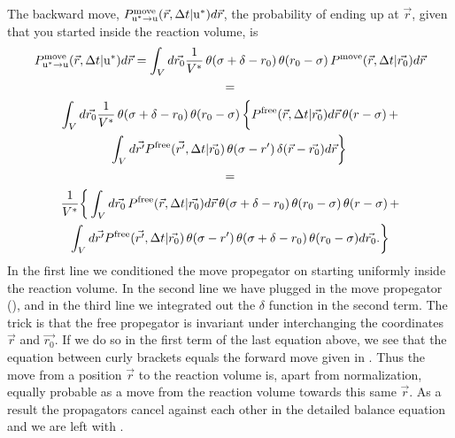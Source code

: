 The backward move, $P_{\rm{u^*} \to \rm{u}}^{\rm move}(\vec{r},\Delta t|{\rm u^*})d\vec{r}$, the probability of ending up at $\vec{r}$, given that you started inside the reaction volume, is
\begin{multline}
P_{\rm{u^*} \to \rm{u}}^{\rm move}(\vec{r},\Delta t|{\rm u^*})d\vec{r} = \int_{V} d\vec{r_0} \frac{1}{V^*} \, \theta(\sigma + \delta - r_0) \, \theta(r_0 - \sigma) \, P^{\rm move}(\vec{r},\Delta t|\vec{r_0})d\vec{r} 
\\ =
\\ \int_{V} d\vec{r_0} \frac{1}{V^*} \, \theta(\sigma + \delta - r_0) \, \theta(r_0 - \sigma) \, \bigg\{ P^{\rm free}(\vec{r},\Delta t|\vec{r_0}) d\vec{r} \, \theta(r - \sigma) \, + 
\\ \int_{V} d\vec{r'} P^{\rm free}(\vec{r'},\Delta t|\vec{r_0}) \, \theta(\sigma - r') \, \delta(\vec{r} - \vec{r_0}) d\vec{r} \bigg\} \, 
\\ = 
\\ \frac{1}{V^*} \bigg\{ \int_{V} d\vec{r_0} \, P^{\rm free}(\vec{r},\Delta t|\vec{r_0}) d\vec{r} \, \theta(\sigma + \delta - r_0) \, \theta(r_0 - \sigma) \, \theta(r - \sigma) \, + 
\\ \int_{V} d\vec{r'} P^{\rm free}(\vec{r'},\Delta t|\vec{r_0}) \, \theta(\sigma - r') \, \theta(\sigma + \delta - r_0)  \, \theta(r_0 - \sigma) d\vec{r_0}. \bigg\}
\end{multline}
In the first line we conditioned the move propegator on starting uniformly inside the reaction volume. In the second line we have plugged in the move propegator (), and in the third line we integrated out the $\delta$ function in the second term. The trick is that the free propegator is invariant under interchanging the coordinates $\vec{r}$ and $\vec{r_0}$. If we do so in the first term of the last equation above, we see that the equation between curly brackets equals the forward move given in . Thus the move from a position $\vec{r}$ to the reaction volume is, apart from normalization, equally probable as a move from the reaction volume towards this same $\vec{r}$. As a result the propagators cancel against each other in the detailed balance equation and we are left with .